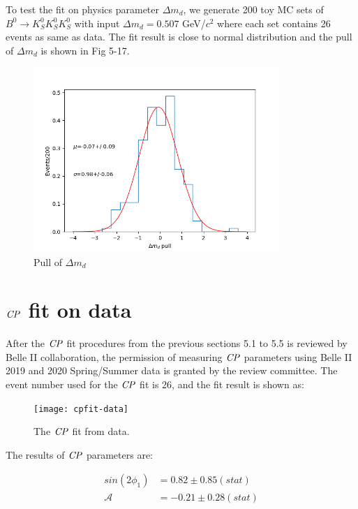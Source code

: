 To test the fit on physics parameter $\Delta m_d$, we generate 200 toy MC sets of $B^0 \to K_S^0  K_S^0  K_S^0$ with input $\Delta m_d = 0.507 $ GeV/$c^2$ where each set contains 26 events as same as data. The fit result is close to normal distribution and the pull of $\Delta m_d$ is shown in Fig 5-17. 
\begin{figure}[H]
	\centering
	\includegraphics[height=7cm]{figures/pull_hist_dm}
	\caption{Pull of $\Delta m_d$}
\end{figure}

\section{$\it{CP}$ fit on data}
After the $\it{CP}$ fit procedures from the previous sections 5.1 to 5.5 is reviewed by Belle II collaboration, the permission of measuring $\it{CP}$ parameters using Belle II 2019 and 2020 Spring/Summer data is granted by the review committee. The event number used for the $\it{CP}$ fit is 26, and the fit result is shown as: 

\begin{figure}[H]
	\centering
	\texttt{[image: cpfit-data]}
	\caption{The $\it{CP}$ fit from data.}
\end{figure}

The results of $\it{CP}$ parameters are: 

\begin{equation}
\begin{split}
sin(2\phi_1) & = 0.82 \pm 0.85(stat) \\
\mathcal{A} & = -0.21 \pm 0.28(stat) \\
\end{split}
\end{equation} 

